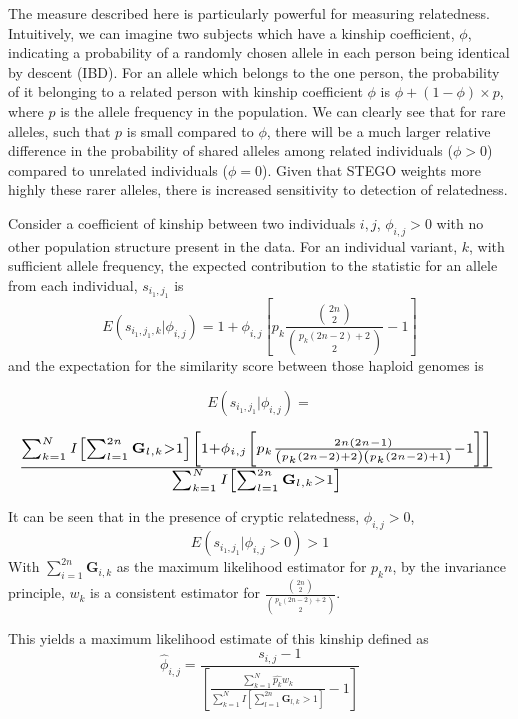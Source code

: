 The measure described here is particularly powerful for measuring relatedness.
Intuitively, we can imagine two subjects which have a kinship coefficient,
$\phi$, indicating a probability of a randomly chosen allele in each
person being identical by descent (IBD). For an allele which belongs
to the one person, the probability of it belonging to a related person
with kinship coefficient $\phi$ is $\phi+\left(1-\phi\right)\times p$,
where $p$ is the allele frequency in the population. We can clearly
see that for rare alleles, such that $p$ is small compared to $\phi$,
there will be a much larger relative difference in the probability
of shared alleles among related individuals ($\phi>0$) compared to
unrelated individuals ($\phi=0$). Given that STEGO weights more highly
these rarer alleles, there is increased sensitivity to detection of
relatedness.

Consider a coefficient of kinship between two individuals $i,j$,
$\phi_{i,j}>0$ with no other population structure present in the
data. For an individual variant, $k$, with sufficient allele frequency,
the expected contribution to the statistic for an allele from each
individual, $s_{i_{1},j_{1}}$ is
\[
E\left(s_{i_{1},j_{1},k}|\phi_{i,j}\right)=1+\phi_{i,j}\left[p_{k}\frac{{2n \choose 2}}{{p_{k}\left(2n-2\right)+2 \choose 2}}-1\right]
\]
and the expectation for the similarity score between those haploid
genomes is

\[
E\left(s_{i_{1},j_{1}}|\phi_{i,j}\right)=
\]

\begin{equation}
\label{eq:Expected with kinship}
\resizebox{\columnwidth}{!}{%
$\frac{\sum_{k=1}^{N}I\left[\sum_{l=1}^{2n}\mathbf{G}_{l,k}>1\right]\left[1+\phi_{i,j}\left[p_{k}\frac{2n\left(2n-1\right)}{\left(p_{k}\left(2n-2\right)+2\right)\left(p_{k}\left(2n-2\right)+1\right)}-1\right]\right]}{\sum_{k=1}^{N}I\left[\sum_{l=1}^{2n}\mathbf{G}_{l,k}>1\right]}$
}
\end{equation}

It can be seen that in the presence of cryptic relatedness, $\phi_{i,j}>0$,
\[
E\left(s_{i_{1},j_{1}}|\phi_{i,j}>0\right)>1
\]
With $\sum_{i=1}^{2n}\mathbf{G}_{i,k}$ as the maximum likelihood
estimator for $p_{k}n$, by the invariance principle, $w_{k}$ is
a consistent estimator for $\frac{{2n \choose 2}}{{p_{k}\left(2n-2\right)+2 \choose 2}}$. 

This yields a maximum likelihood estimate of this kinship defined
as 
\begin{equation}
\hat{\phi}_{i,j}=\frac{s_{i,j}-1}{\left[\frac{\sum_{k=1}^{N}\hat{p_{k}}w_{k}}{\sum_{k=1}^{N}I\left[\sum_{l=1}^{2n}\mathbf{G}_{l,k}>1\right]}-1\right]}\label{Estimated Kinship}
\end{equation}

